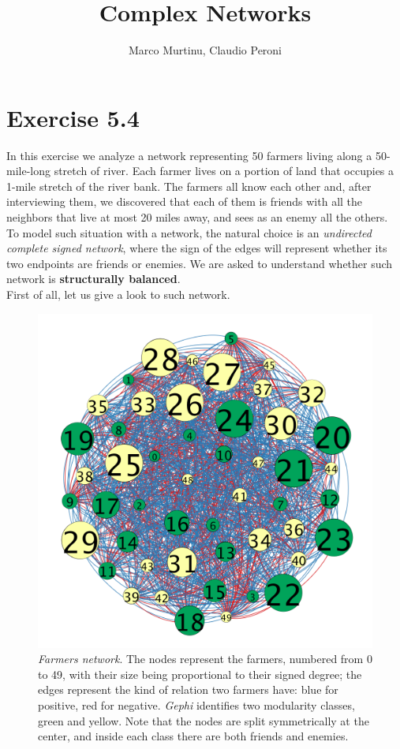 \documentclass{report}
\title{Complex Networks}
\author{{Marco Murtinu, Claudio Peroni}}
\theoremstyle{definition}
\theoremstyle{remark}
\begin{document}
	\maketitle

\section*{Exercise 5.4}

In this exercise we analyze a network representing 50 farmers living along a 50-mile-long stretch of river. Each farmer lives on a portion of land that occupies a 1-mile stretch of the river bank. The farmers all know each other and, after interviewing them, we discovered that each of them is friends with all the neighbors that live at most 20 miles away, and sees as an enemy all the others.\\
To model such situation with a network, the natural choice is an \textit{undirected complete signed network}, where the sign of the edges will represent whether its two endpoints are friends or enemies. We are asked to understand whether such network is \textbf{structurally balanced}.\\
First of all, let us give a look to such network.\\
\begin{figure} [h]
	\centering
	\includegraphics [scale = 0.3]{farmers_complete.png}
	\caption{\textit{Farmers network}. The nodes represent the farmers, numbered from 0 to 49, with their size being proportional to their signed degree; the edges represent the kind of relation two farmers have: blue for positive, red for negative. \textit{Gephi} identifies two modularity classes, green and yellow. Note that the nodes are split symmetrically at the center, and inside each class there are both friends and enemies.} 	\label{fig:50farmers}
\end{figure}
\end{document}
